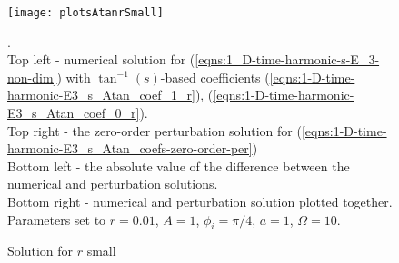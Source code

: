 \documentclass[12pt,twoside]{report}
\newtheorem{thm}{Theorem}[subsection]
\begin{document}
\begin{figure}
\begin{center}
\texttt{[image: plotsAtanrSmall]}
\end{center}
\caption {Solution for $r$ small }.\\
Top left - numerical solution for (\ref{eqns:1_D-time-harmonic-s-E_3-non-dim}) with $\tan^{-1}(s)$-based coefficients (\ref{eqns:1-D-time-harmonic-E3_s_Atan_coef_1_r}), (\ref{eqns:1-D-time-harmonic-E3_s_Atan_coef_0_r}).\\
Top right - the zero-order perturbation solution for (\ref{eqns:1-D-time-harmonic-E3_s_Atan_coefs-zero-order-per})\\
Bottom left - the absolute value of the difference between the numerical and perturbation solutions.\\
Bottom right - numerical and perturbation solution plotted together.\\ 
Parameters set to $r=0.01$, $A=1$, $\phi_i = \pi/4$, $a=1$, $\Omega=10$.
\label{fig:plotsAtanrSmall}
\end{figure}


\begin{comment}

\subsubsection{Passage to a Sturm-form BVP}
Equation (\ref{eqns:1-D-time-harmonic-E3_z}) is a linear, homogeneous real valued variable coefficients second order ODE. We can estimate its solution's period of oscillation using Sturm's comparison theorem \cite{BirkhoffRota1989}:

\begin{thm}
\label{thm:Sturm-Comparison}
Let $f(x)$ and $g(x)$ be nontrivial solutions of the DEs $u''+p(x)u=0$ and $v''+q(x)v=0$, respectively., where $p(x) \geq q(x)$. Then $f(x)$ vanishes at least once between any two zeros of $g(x)$, unless $p(x) \equiv q(x)$ and if $f$ is a constant multiple of $g$. 
\end{thm}
As we can see, the theorem requires the equation's first order derivative coefficient to vanish. Thus equation (\ref{eqns:1-D-time-harmonic-E3_z}) must be transformed to such form. \\
Letting $\hat{E}_3 = \epsilon^{-1/2}u(z)$ we get
\begin{align}
\label{eqns:1-D-harmonic-z-Sturm}
\dfrac{d^2 u}{dz^2} +\dfrac{\omega^2 \epsilon^3(z)-\frac{3}{4}(\epsilon'(z))^2+\frac{1}{2}\epsilon(z)\epsilon''(z)}{\epsilon(z)}u=0
\end{align}
Since $\epsilon(z)$, $\epsilon'(z)$, $\epsilon''(z)$ are bounded and $\epsilon(z)$ is strictly positive, we can take $\omega^2$ large enough so that the right hand side of (\ref{eqns:1-D-harmonic-z-Sturm}) would be larger than $\dfrac{\omega^2}{2\epsilon_2}$ for all $-\delta<z<\delta$.In such case, the solutions for (\ref{eqns:1-D-harmonic-z-Sturm}) oscillate at a frequency of at least $\dfrac{\omega}{2\pi\sqrt{2 \epsilon_2}}$.




\end{comment}
\end{document}

